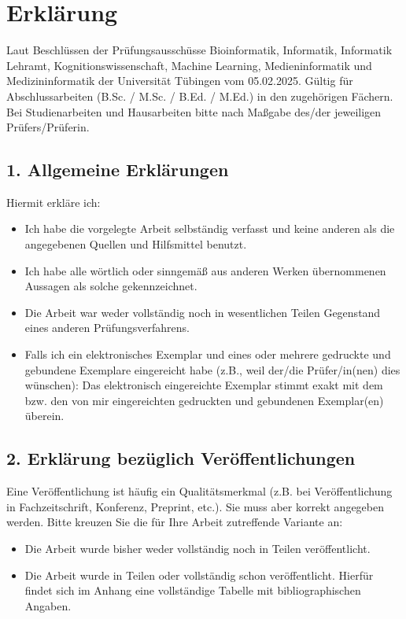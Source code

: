 \chapter*{Erklärung}
\markboth{}{}
\thispagestyle{empty}

Laut Beschlüssen der Prüfungsausschüsse Bioinformatik, Informatik, Informatik Lehramt, Kognitionswissenschaft, Machine Learning, Medieninformatik und Medizininformatik der Universität Tübingen vom 05.02.2025. Gültig für Abschlussarbeiten (B.Sc. / M.Sc. / B.Ed. / M.Ed.) in den zugehörigen Fächern. Bei Studienarbeiten und Hausarbeiten bitte nach Maßgabe des/der jeweiligen Prüfers/Prüferin.

\section*{1. Allgemeine Erklärungen}

Hiermit erkläre ich:

\begin{itemize}
    \item Ich habe die vorgelegte Arbeit selbständig verfasst und keine anderen als die angegebenen Quellen und Hilfsmittel benutzt.
    \item Ich habe alle wörtlich oder sinngemäß aus anderen Werken übernommenen Aussagen als solche gekennzeichnet.
    \item Die Arbeit war weder vollständig noch in wesentlichen Teilen Gegenstand eines anderen Prüfungsverfahrens.
    \item Falls ich ein elektronisches Exemplar und eines oder mehrere gedruckte und gebundene Exemplare eingereicht habe (z.B., weil der/die Prüfer/in(nen) dies wünschen): Das elektronisch eingereichte Exemplar stimmt exakt mit dem bzw. den von mir eingereichten gedruckten und gebundenen Exemplar(en) überein.
\end{itemize}

\section*{2. Erklärung bezüglich Veröffentlichungen}

Eine Veröffentlichung ist häufig ein Qualitätsmerkmal (z.B. bei Veröffentlichung in Fachzeitschrift, Konferenz, Preprint, etc.). Sie muss aber korrekt angegeben werden. Bitte kreuzen Sie die für Ihre Arbeit zutreffende Variante an:

\begin{itemize}
    \item[\checkboxUnchecked] Die Arbeit wurde bisher weder vollständig noch in Teilen veröffentlicht.
    \item[\checkboxUnchecked]Die Arbeit wurde in Teilen oder vollständig schon veröffentlicht. Hierfür findet sich im Anhang eine vollständige Tabelle mit bibliographischen Angaben.
\end{itemize}

